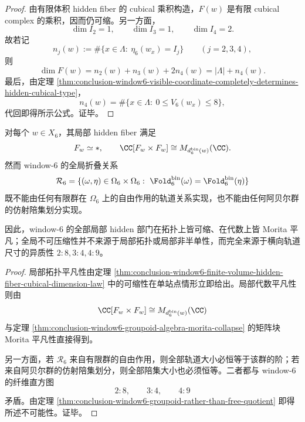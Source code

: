 \begin{proof}
由有限体积 hidden fiber 的 cubical 乘积构造，\(F(w)\) 是有限 cubical complex 的乘积，因而仍可缩。另一方面，
\[
\dim I_2=1,
\qquad
\dim I_3=1,
\qquad
\dim I_4=2.
\]
故若记
\[
n_j(w):=\#\{x\in\Lambda:\ \eta_6(w_x)=I_j\}
\qquad (j=2,3,4),
\]
则
\[
\dim F(w)=n_2(w)+n_3(w)+2n_4(w)=|\Lambda|+n_4(w).
\]
最后，由定理 \ref{thm:conclusion-window6-visible-coordinate-completely-determines-hidden-cubical-type}，
\[
n_4(w)=\#\{x\in\Lambda:\ 0\le V_6(w_x)\le 8\},
\]
代回即得所示公式。证毕。
\end{proof}

\begin{theorem}\label{thm:conclusion-window6-local-morita-trivial-global-nonorbitizable}
对每个 \(w\in X_6\)，其局部 hidden fiber 满足
\[
F_w\simeq *,
\qquad
\CC[F_w\times F_w]\cong M_{d_6^{\mathrm{bin}}(w)}(\CC).
\]
然而 window-\(6\) 的全局折叠关系
\[
\mathcal R_6=\{(\omega,\eta)\in \Omega_6\times \Omega_6:\ \Fold_6^{\mathrm{bin}}(\omega)=\Fold_6^{\mathrm{bin}}(\eta)\}
\]
既不能由任何有限群在 \(\Omega_6\) 上的自由作用的轨道关系实现，也不能由任何阿贝尔群的仿射陪集划分实现。

因此，window-\(6\) 的全部局部 hidden 部门在拓扑上皆可缩、在代数上皆 Morita 平凡；全局不可压缩性并不来源于局部拓扑或局部非半单性，而完全来源于横向轨道尺寸的异质性 \(2:8,3:4,4:9\)。
\end{theorem}

\begin{proof}
局部拓扑平凡性由定理 \ref{thm:conclusion-window6-finite-volume-hidden-fiber-cubical-dimension-law} 中的可缩性在单站点情形立即给出。局部代数平凡性则由
\[
\CC[F_w\times F_w]\cong M_{d_6^{\mathrm{bin}}(w)}(\CC)
\]
与定理 \ref{thm:conclusion-window6-groupoid-algebra-morita-collapse} 的矩阵块 Morita 平凡性直接得到。

另一方面，若 \(\mathcal R_6\) 来自有限群的自由作用，则全部轨道大小必恒等于该群的阶；若来自阿贝尔群的仿射陪集划分，则全部陪集大小也必须恒等。二者都与 window-\(6\) 的纤维直方图
\[
2:8,\qquad 3:4,\qquad 4:9
\]
矛盾。由定理 \ref{thm:conclusion-window6-groupoid-rather-than-free-quotient} 即得所述不可能性。证毕。
\end{proof}

